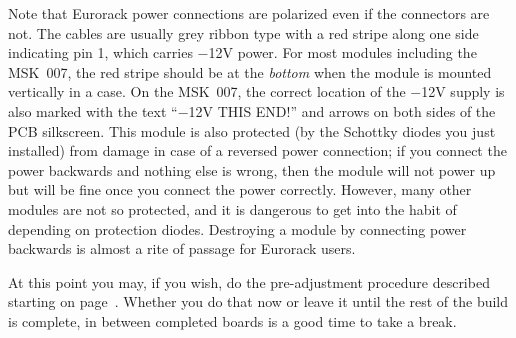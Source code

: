 Note that Eurorack power connections are polarized even if the connectors
are not.  The cables are usually grey ribbon type with a red stripe along
one side indicating pin 1, which carries $-$12V power.  For most modules
including the MSK~007, the red stripe should be at the \emph{bottom} when
the module is mounted vertically in a case.  On the MSK~007, the correct
location of the $-$12V supply is also marked with the text ``$-$12V THIS
END!'' and arrows on both sides of the PCB silkscreen.  This module is
also protected (by the Schottky diodes you just installed) from damage in
case of a reversed power connection; if you connect the power backwards and
nothing else is wrong, then the module will not power up but will be fine
once you connect the power correctly.  However, many other modules are not
so protected, and it is dangerous to get into the habit of depending on
protection diodes.  Destroying a module by connecting power backwards is
almost a rite of passage for Eurorack users.

At this point you may, if you wish, do the pre-adjustment procedure
described starting on page~\pageref{ch:preadj}.  Whether you do that now or
leave it until the rest of the build is complete, in between completed
boards is a good time to take a break.

